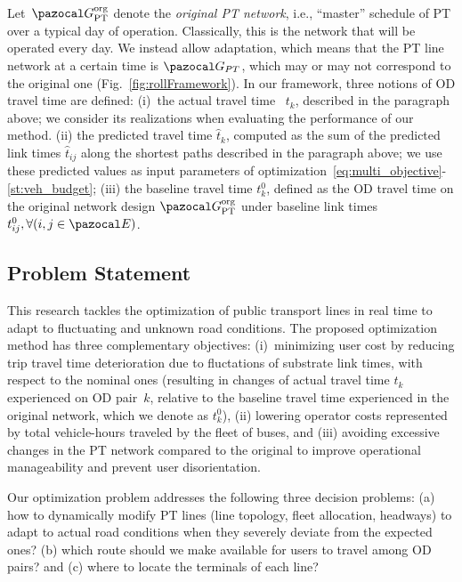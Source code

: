\documentclass[a4paper,fleqn]{cas-sc}
\begin{document}
Let~$\pazocal G_\text{PT}^\text{org}$ denote the \emph{original PT network}, i.e., ``master'' schedule of PT over a typical day of operation. Classically, this is the network that will be operated every day. We instead allow adaptation, which means that the PT line network at a certain time is $\pazocal G_{PT}$, which may or may not correspond to the original one (Fig.~\ref{fig:rollFramework}).
%
In our framework, three notions of OD travel time are defined:
(i)~the actual travel time ~$t_k$, described in the paragraph above; we consider its realizations when evaluating the performance of our method.
(ii) the predicted travel time $\hat t_k$, computed as the sum of the predicted link times $\hat t_{ij}$ along the shortest paths described in the paragraph above; we use these predicted values as input parameters of optimization~\eqref{eq:multi_objective}-\eqref{st:veh_budget};
(iii) the baseline travel time $t_k^0$, defined as the OD travel time on the original network design $\pazocal G_\text{PT}^\text{org}$ under baseline link times $t_{ij}^0,\forall (i,j\in\pazocal E)$.
\subsection{Problem Statement}\label{sec:problemStatement}
This research tackles the optimization of public transport lines in real time to adapt to fluctuating and unknown road conditions.
%
The proposed optimization method has three complementary objectives: 
(i)~minimizing user cost by reducing trip travel time deterioration due to fluctations of substrate link times, with respect to the nominal ones (resulting in changes of actual travel time $t_k$ experienced on OD pair~$k$, relative to the baseline travel time experienced in the original network, which we denote as $t_k^0$), 
(ii) lowering operator costs represented by total vehicle-hours traveled by the fleet of buses, and (iii) avoiding excessive changes in the PT network compared to the original to improve operational manageability and prevent user disorientation.

Our optimization problem addresses the following three decision problems:
(a) how to dynamically modify PT lines (line topology, fleet allocation, headways) to adapt to actual road conditions when they severely deviate from the expected ones?
(b) which route should we make available for users to travel among OD pairs? and
(c) where to locate the terminals of each line?
\end{document}
